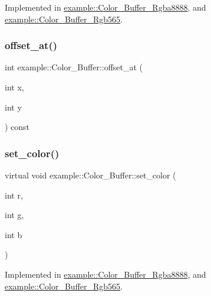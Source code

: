 Implemented in \mbox{\hyperlink{classexample_1_1_color___buffer___rgba8888_a66e133b6fd196f02a0ba454dd3fc550f}{example\+::\+Color\+\_\+\+Buffer\+\_\+\+Rgba8888}}, and \mbox{\hyperlink{classexample_1_1_color___buffer___rgb565_a990c8e8f928b672ab82f7364b12eadb2}{example\+::\+Color\+\_\+\+Buffer\+\_\+\+Rgb565}}.

\mbox{\label{classexample_1_1_color___buffer_ae316a2df43a9ead02cc45170a8d0f7ed}} 
\subsubsection{\texorpdfstring{offset\_at()}{offset\_at()}}
{\footnotesize\ttfamily int example\+::\+Color\+\_\+\+Buffer\+::offset\+\_\+at (\begin{DoxyParamCaption}\item[{int}]{x,  }\item[{int}]{y }\end{DoxyParamCaption}) const\hspace{0.3cm}{\ttfamily [inline]}}

\mbox{\label{classexample_1_1_color___buffer_a3fbfa949ee340ccdb40ad0ce8339b827}} 
\subsubsection{\texorpdfstring{set\_color()}{set\_color()}}
{\footnotesize\ttfamily virtual void example\+::\+Color\+\_\+\+Buffer\+::set\+\_\+color (\begin{DoxyParamCaption}\item[{int}]{r,  }\item[{int}]{g,  }\item[{int}]{b }\end{DoxyParamCaption})\hspace{0.3cm}{\ttfamily [pure virtual]}}



Implemented in \mbox{\hyperlink{classexample_1_1_color___buffer___rgba8888_a408bf6adf54fc9958b74d21c8f6da178}{example\+::\+Color\+\_\+\+Buffer\+\_\+\+Rgba8888}}, and \mbox{\hyperlink{classexample_1_1_color___buffer___rgb565_ac38babd86731bf63703875706b0138c6}{example\+::\+Color\+\_\+\+Buffer\+\_\+\+Rgb565}}.

